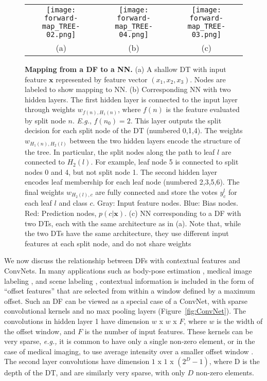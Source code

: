 \documentclass[twocolumn]{svjour3}
\begin{document}
\begin{figure*}
\begin{center}
\begin{tabular}{ccc}

   \texttt{[image: forward-map\_TREE-02.png]} &
   \texttt{[image: forward-map\_TREE-04.png]} &
   \texttt{[image: forward-map\_TREE-03.png]} \\
				   (a) & (b) & (c)
\end{tabular}
\end{center}
   \caption{\textbf{Mapping from a DF to a NN.} (a) A shallow DT with input feature $\mathbf{x}$ represented by feature vector $(x_1,x_2,x_3)$. Nodes are labeled to show mapping to NN. (b) Corresponding NN with two hidden layers. The first hidden layer is connected to the input layer through weights $w_{f(n),H_1(n)}$, where $f(n)$ is the feature evaluated by split node $n$. \textit{E.g.}, $f(n_0)=2$.  This layer outputs the split decision for each split node of the DT (numbered 0,1,4). The weights $w_{H_1(n),H_2(l)}$ between the two hidden layers encode the structure of the tree. In particular, the split nodes along the path to leaf $l$ are connected to $H_2(l)$. For example, leaf node 5 is connected to split nodes 0 and 4, but not split node 1. The second hidden layer encodes leaf membership for each leaf node (numbered 2,3,5,6). The final weights $w_{H_2(l),c}$ are fully connected and store the votes $y^l_c$ for each leaf $l$ and class $c$. Gray: Input feature nodes. Blue: Bias nodes. Red: Prediction nodes, $p(c | \mathbf{x})$. (c) NN corresponding to a DF with two DTs, each with the same architecture as in (a). Note that, while the two DTs have the same architecture, they use different input features at each split node, and do not share weights}
\label{fig:forward-map_TREE}
\end{figure*}

%
We now discuss the relationship between DFs with contextual features and ConvNets.
In many applications such as body-pose estimation \cite{shaoqing15grrf}, medical image labeling \cite{ERFs}, and scene labeling \cite{Tu2010}, contextual information is included in the form of ``offset features'' that are selected from within a window defined by a maximum offset.
Such an DF can be viewed as a special case of a ConvNet, with sparse convolutional kernels and no max pooling layers (Figure~\ref{fig:ConvNet}).
The convolutions in hidden layer 1 have dimension $w$ x $w$ x $F$, where $w$ is the width of the offset window, and $F$ is the number of input features.
% 
These kernels can be very sparse, \emph{e.g.,} it is common to have only a single non-zero element, or in the case of medical imaging, to use average intensity over a smaller offset window \cite{ERFs}.
The second layer convolutions have dimension $1$ x $1$ x $(2^D-1)$, where D is the depth of the DT, and are similarly very sparse, with only $D$ non-zero elements.
\end{document}

